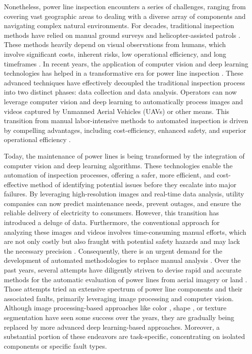 Nonetheless, power line inspection encounters a series of challenges, ranging from covering vast geographic areas to dealing with a diverse array of components and navigating complex natural environments. For decades, traditional inspection methods have relied on manual ground surveys and helicopter-assisted patrols \cite{liu_two_layer_2019}. These methods heavily depend on visual observations from humans, which involve significant costs, inherent risks, low operational efficiency, and long timeframes \cite{matikainen_remote_2016}. In recent years, the application of computer vision and deep learning technologies has helped in a transformative era for power line inspection \cite{yang_review_2020}. These advanced techniques have effectively decoupled the traditional inspection process into two distinct phases: data collection and data analysis. Operators can now leverage computer vision and deep learning to automatically process images and videos captured by Unmanned Aerial Vehicles (UAVs) or other means. This transition from manual labor-intensive methods to automated inspection is driven by compelling advantages, including cost-efficiency, enhanced safety, and superior operational efficiency \cite{yang_review_2020}.

Today, the maintenance of power lines is being transformed by the integration of computer vision and deep learning algorithms. These technologies enable the automation of inspection processes, offering a safer, more efficient, and cost-effective method of identifying potential issues before they escalate into major failures. By leveraging high-resolution images and real-time data analysis, utility companies can now predict maintenance needs, prevent outages, and ensure the reliable delivery of electricity to consumers. However, this transition has introduced a deluge of data. Furthermore, the conventional approach for analyzing these images and videos involves time-consuming manual efforts, which are not only costly but also fraught with potential safety hazards and may lack the necessary precision \cite{martinez_power_2018}. Consequently, there is an urgent demand for the development of automated methodologies to replace manual analysis \cite{liu_data_2020}. Over the past years, several attempts have diligently striven to devise rapid and accurate methods for the automatic evaluation of power lines from aerial imagery or land \cite{nguyen_automatic_2018}. Those attempts tried an extensive spectrum of power line components and their associated faults, primarily leveraging image processing and computer vision. Although image processing-based approaches like color \cite{reddy_condition_2013}, shape \cite{zhao_localization_2015}, or texture segmentation \cite{wu_texture_2012} have seen some success over the years, they are gradually being replaced by more advanced deep learning-based approaches. Moreover, a substantial portion of these endeavors are task-specific, concentrating on isolated components or specific fault types. 

